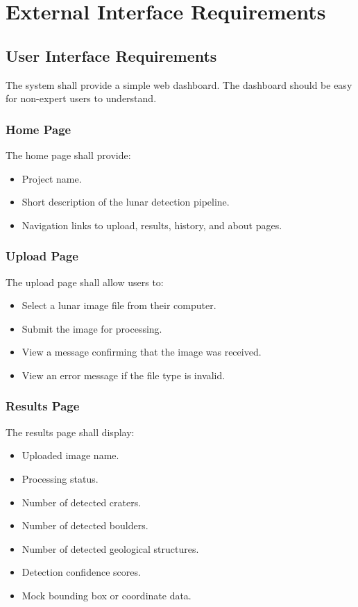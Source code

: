 \documentclass[12pt]{article}
\begin{document}
\section{External Interface Requirements}

\subsection{User Interface Requirements}

The system shall provide a simple web dashboard. The dashboard should be easy for non-expert users to understand.

\subsubsection{Home Page}

The home page shall provide:

\begin{itemize}
    \item Project name.
    \item Short description of the lunar detection pipeline.
    \item Navigation links to upload, results, history, and about pages.
\end{itemize}

\subsubsection{Upload Page}

The upload page shall allow users to:

\begin{itemize}
    \item Select a lunar image file from their computer.
    \item Submit the image for processing.
    \item View a message confirming that the image was received.
    \item View an error message if the file type is invalid.
\end{itemize}

\subsubsection{Results Page}

The results page shall display:

\begin{itemize}
    \item Uploaded image name.
    \item Processing status.
    \item Number of detected craters.
    \item Number of detected boulders.
    \item Number of detected geological structures.
    \item Detection confidence scores.
    \item Mock bounding box or coordinate data.
\end{itemize}
\end{document}
